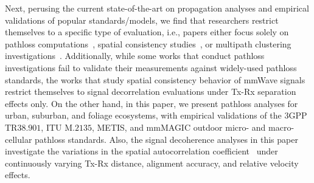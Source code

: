 \documentclass[12pt, draftcls, onecolumn]{IEEEtran}
\begin{document}
Next, perusing the current state-of-the-art on propagation analyses and empirical validations of popular standards/models, we find that researchers restrict themselves to a specific type of evaluation, i.e., papers either focus solely on pathloss computations~\cite{Qualcomm3GPP, MacCartneyModelsOverview, MacCartneyRural, FoliageSimulations, SuburbanGeometryJournal}, spatial consistency studies~\cite{SpatialConsistencyOriginal}, or multipath clustering investigations~\cite{QDC_NIST, D2DHumanBlockage}. Additionally, while some works that conduct pathloss investigations fail to validate their measurements against widely-used pathloss standards, the works that study spatial consistency behavior of mmWave signals restrict themselves to signal decorrelation evaluations under Tx-Rx separation effects only. On the other hand, in this paper, we present pathloss analyses for urban, suburban, and foliage ecosystems, with empirical validations of the $3$GPP TR$38.901$, ITU M$.2135$, METIS, and mmMAGIC outdoor micro- and macro-cellular pathloss standards. Also, the signal decoherence analyses in this paper investigate the variations in the spatial autocorrelation coefficient~\cite{SpatialConsistencyOriginal} under continuously varying Tx-Rx distance, alignment accuracy, and relative velocity effects.
\end{document}
